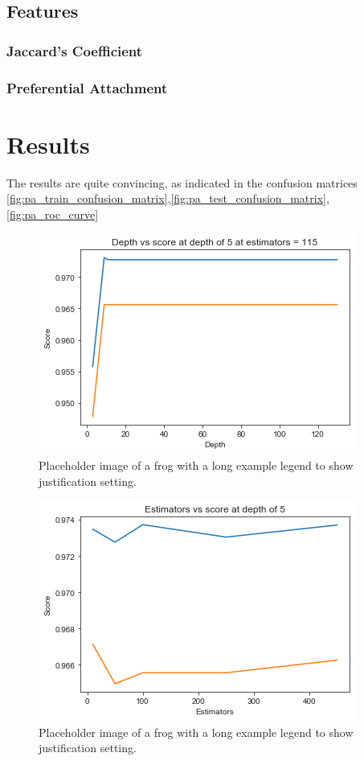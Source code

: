 \documentclass[9pt,twoside]{pnas-new}
\begin{document}
\subsection*{Features}

\subsubsection*{Jaccard's Coefficient}
\subsubsection*{Preferential Attachment}
\cite{sadraei}
\section*{Results}
The results are quite convincing, as indicated in the confusion matrices \ref{fig:pa_train_confusion_matrix},\ref{fig:pa_test_confusion_matrix},\ref{fig:pa_roc_curve}



\begin{figure}%
    \centering
    \includegraphics[width=.8\linewidth]{Figures/mt_depth_score.png}
    \caption{Placeholder image of a frog with a long example legend to show justification setting.}
    \label{fig:mt_depth_score}
\end{figure}

\begin{figure}%
    \centering
    \includegraphics[width=.8\linewidth]{Figures/mt_estimator_score.png}
    \caption{Placeholder image of a frog with a long example legend to show justification setting.}
    \label{fig:mt_estimator_score}
\end{figure}
\end{document}
